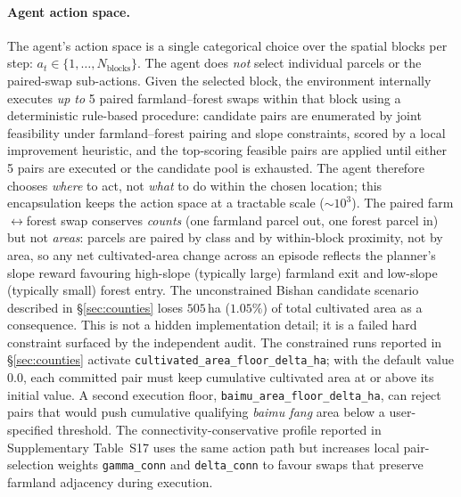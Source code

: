 \documentclass[11pt]{article}
\begin{document}
\paragraph{Agent action space.}
The agent's action space is a single categorical choice over the spatial blocks per step: $a_t \in \{1, \ldots, N_{\text{blocks}}\}$. The agent does \emph{not} select individual parcels or the paired-swap sub-actions. Given the selected block, the environment internally executes \emph{up to} 5 paired farmland--forest swaps within that block using a deterministic rule-based procedure: candidate pairs are enumerated by joint feasibility under farmland--forest pairing and slope constraints, scored by a local improvement heuristic, and the top-scoring feasible pairs are applied until either 5 pairs are executed or the candidate pool is exhausted. The agent therefore chooses \emph{where} to act, not \emph{what} to do within the chosen location; this encapsulation keeps the action space at a tractable scale ($\sim 10^3$). The paired farm$\leftrightarrow$forest swap conserves \emph{counts} (one farmland parcel out, one forest parcel in) but not \emph{areas}: parcels are paired by class and by within-block proximity, not by area, so any net cultivated-area change across an episode reflects the planner's slope reward favouring high-slope (typically large) farmland exit and low-slope (typically small) forest entry. The unconstrained Bishan candidate scenario described in \S\ref{sec:counties} loses $505$\,ha ($1.05\%$) of total cultivated area as a consequence. This is not a hidden implementation detail; it is a failed hard constraint surfaced by the independent audit. The constrained runs reported in \S\ref{sec:counties} activate \texttt{cultivated\_area\_floor\_delta\_ha}; with the default value $0.0$, each committed pair must keep cumulative cultivated area at or above its initial value. A second execution floor, \texttt{baimu\_area\_floor\_delta\_ha}, can reject pairs that would push cumulative qualifying \textit{baimu fang} area below a user-specified threshold. The connectivity-conservative profile reported in Supplementary Table~S17 uses the same action path but increases local pair-selection weights \texttt{gamma\_conn} and \texttt{delta\_conn} to favour swaps that preserve farmland adjacency during execution.
\end{document}
